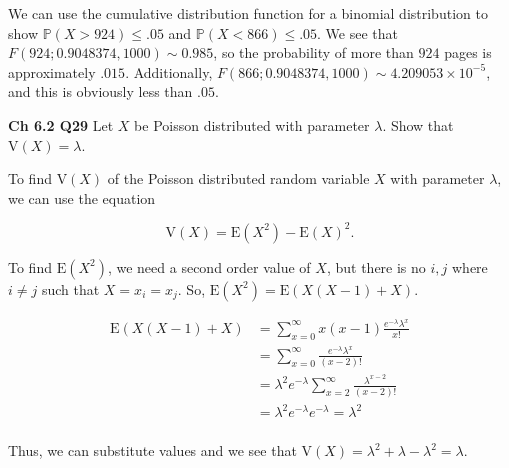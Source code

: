 \documentclass[12pt]{article}
\newcommand{\nspace}{\vspace*{.5cm}}
\newcommand{\nline}{\nspace \noindent}
\newcommand{\expected}[1]{\text{E}(#1)}
\begin{document}
\nline
We can use the cumulative distribution function for a binomial distribution to show $\mathbb{P}(X > 924) \leq .05$ and $\mathbb{P}(X < 866) \leq .05$. We see that $F(924; 0.9048374, 1000) \sim 0.985$, so the probability of more than $924$ pages is approximately $.015$. Additionally, $F(866; 0.9048374, 1000) \sim 4.209053 \times 10^{-5}$, and this is obviously less than $.05$.

\nline
\textbf{Ch 6.2 Q29} Let $X$ be Poisson distributed with parameter $\lambda$. Show that $\text{V}(X) = \lambda$.   

\nline
To find $\text{V}(X)$ of the Poisson distributed random variable $X$ with parameter $\lambda$, we can use the equation

\begin{equation*}
\text{V}(X) = \expected{X^2} - \expected{X}^2.
\end{equation*}

\nline
To find $\expected{X^2}$, we need a second order value of $X$, but there is no $i,j$ where $i \neq j$ such that $X=x_i=x_j$. So, $\expected{X^2} = \expected{X(X-1) + X}$.

\begin{align*}
\expected{X(X-1) + X} &= \sum_{x=0}^{\infty} x(x-1) \frac{ e^{- \lambda} \lambda^x }{x!} \\
&= \sum_{x=0}^{\infty} \frac{ e^{- \lambda} \lambda^x }{(x-2)!} \\
&= \lambda^2  e^{- \lambda} \sum_{x=2}^{\infty} \frac{ \lambda^{x-2} }{(x-2)!} \\
&= \lambda^2  e^{- \lambda} e^{- \lambda} =  \lambda^2\\
\end{align*}

\nline
Thus, we can substitute values and we see that $\text{V}(X) = \lambda^2 + \lambda - \lambda^2 = \lambda$.
\end{document}
